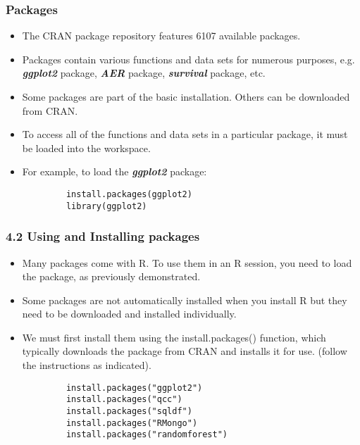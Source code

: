 \documentclass{beamer}
\begin{document}
 	\begin{frame}[fragile]
 		
 		\frametitle{Packages}
 		\begin{itemize}
 			\item The CRAN package repository features 6107 available packages. 
 			\item Packages contain
 			various functions and data sets for numerous purposes, e.g.
 			\textbf{\textit{ggplot2}} package, \textbf{\textit{AER}} package, \textbf{\textit{survival}} package, etc.
 			\item Some packages are part of the basic installation. Others can be
 			downloaded from CRAN.
 			\item To access all of the functions and data sets in a particular package,
 			it must be loaded into the workspace. 
 			\item For example, to load the
 			\textbf{\textit{ggplot2}} package:
 		\end{itemize}
 		\begin{framed}
 			\begin{verbatim}
 			install.packages(ggplot2)
 			library(ggplot2)
 			\end{verbatim}
 		\end{framed}
 	\end{frame}
 	\begin{frame}
 		\frametitle{4.2 Using and Installing packages}
 		\begin{itemize}
 			\item Many packages come with R. To use them in an R session, you need to load the package, as
 			previously demonstrated.
 			\item Some packages are not automatically installed when you install R but they need to be downloaded
 			and installed individually. 
 			\item We must first install them using the install.packages()
 			function, which typically downloads the package from CRAN and installs it for use. (follow the
 			instructions as indicated).
 		\end{itemize}
 	\end{frame}
 	\begin{frame}[fragile]
 		\begin{framed}
 			\begin{verbatim}
 			install.packages("ggplot2")
 			install.packages("qcc")
 			install.packages("sqldf")
 			install.packages("RMongo")
 			install.packages("randomforest")
 			\end{verbatim}
 		\end{framed}
 		
 	\end{frame}
\end{document}
